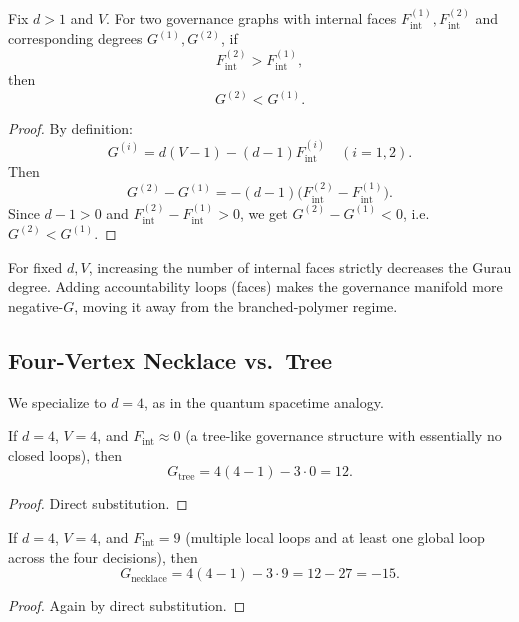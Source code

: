 \documentclass[11pt]{article}
\begin{document}
\begin{lemma}
Fix \(d > 1\) and \(V\). For two governance graphs with internal faces \(F_{\mathrm{int}}^{(1)},F_{\mathrm{int}}^{(2)}\) and corresponding degrees \(G^{(1)},G^{(2)}\), if
\[
F_{\mathrm{int}}^{(2)} > F_{\mathrm{int}}^{(1)},
\]
then
\[
G^{(2)} < G^{(1)}.
\]
\end{lemma}

\begin{proof}
By definition:
\[
G^{(i)} = d(V - 1) - (d-1)F_{\mathrm{int}}^{(i)}\quad (i=1,2).
\]
Then
\[
G^{(2)} - G^{(1)} = -(d-1)\big(F_{\mathrm{int}}^{(2)} - F_{\mathrm{int}}^{(1)}\big).
\]
Since \(d-1 > 0\) and \(F_{\mathrm{int}}^{(2)} - F_{\mathrm{int}}^{(1)} > 0\), we get \(G^{(2)} - G^{(1)} < 0\), i.e.\ \(G^{(2)} < G^{(1)}\).
\end{proof}

\begin{corollary}
For fixed \(d,V\), increasing the number of internal faces strictly decreases the Gurau degree. Adding accountability loops (faces) makes the governance manifold more negative-\(G\), moving it away from the branched-polymer regime.
\end{corollary}

\subsection{Four-Vertex Necklace vs.\ Tree}

We specialize to \(d = 4\), as in the quantum spacetime analogy.

\begin{lemma}
If \(d=4\), \(V=4\), and \(F_{\mathrm{int}} \approx 0\) (a tree-like governance structure with essentially no closed loops), then
\[
G_{\mathrm{tree}} = 4(4-1) - 3\cdot 0 = 12.
\]
\end{lemma}

\begin{proof}
Direct substitution.
\end{proof}

\begin{lemma}
If \(d=4\), \(V=4\), and \(F_{\mathrm{int}} = 9\) (multiple local loops and at least one global loop across the four decisions), then
\[
G_{\mathrm{necklace}} = 4(4-1) - 3\cdot 9 = 12 - 27 = -15.
\]
\end{lemma}

\begin{proof}
Again by direct substitution.
\end{proof}
\end{document}
